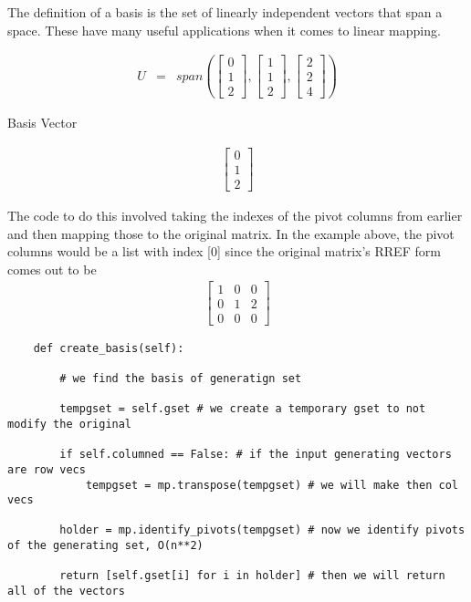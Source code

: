 \documentclass[12pt, a4paper]{article}
\begin{document}
The definition of a basis is the set of linearly independent vectors that span a space. 
These have many useful applications when it comes to linear mapping. 

\begin{eqnarray*}
    U &=& span(\begin{bmatrix}
        0 \\
        1 \\
        2
    \end{bmatrix}, 
    \begin{bmatrix}
        1 \\
        1 \\
        2 
    \end{bmatrix},
    \begin{bmatrix}
        2 \\
        2 \\
        4
    \end{bmatrix})
\end{eqnarray*}

Basis Vector

\begin{eqnarray*}
    \begin{bmatrix}
        0 \\
        1 \\
        2
    \end{bmatrix}
\end{eqnarray*}

The code to do this involved taking the indexes of the pivot columns from earlier and then mapping those to the original matrix.
In the example above, the pivot columns would be a list with index [0] since the original matrix's RREF form comes out to be 
\begin{eqnarray}
    \begin{bmatrix}
        1 & 0 & 0 \\
        0 & 1 & 2 \\
        0 & 0 & 0
    \end{bmatrix}
\end{eqnarray}

\begin{lstlisting}
    def create_basis(self): 

        # we find the basis of generatign set

        tempgset = self.gset # we create a temporary gset to not modify the original

        if self.columned == False: # if the input generating vectors are row vecs
            tempgset = mp.transpose(tempgset) # we will make then col vecs

        holder = mp.identify_pivots(tempgset) # now we identify pivots of the generating set, O(n**2)

        return [self.gset[i] for i in holder] # then we will return all of the vectors
\end{lstlisting}
\end{document}
